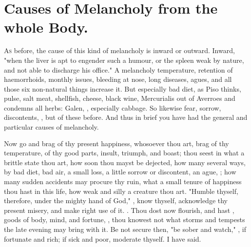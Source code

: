 \section{Causes of Melancholy from the whole Body.}

\lettrine{A}{s} before, the cause of this kind of melancholy is inward or
outward. Inward, "when the liver is apt to engender such a
humour, or the spleen weak by nature, and not able to discharge his office." A
melancholy temperature, retention of haemorrhoids, monthly issues, bleeding at
nose, long diseases, agues, and all those six non-natural things increase it.
But especially bad diet, as Piso thinks, pulse, salt meat,
shellfish, cheese, black wine, \etc{} Mercurialis out of Averroes and \Avicenna{}
condemns all herbs: Galen, , especially cabbage. So likewise fear, sorrow, discontents, \etc{}, but of
these before. And thus in brief you have had the general and particular causes
of melancholy.

Now go and brag of thy present happiness, whosoever thou art, brag of thy
temperature, of thy good parts, insult, triumph, and boast; thou seest in what
a brittle state thou art, how soon thou mayst be dejected, how many several
ways, by bad diet, bad air, a small loss, a little sorrow or discontent, an
ague, \etc{}; how many sudden accidents may procure thy ruin, what a small
tenure of happiness thou hast in this life, how weak and silly a creature thou
art. "Humble thyself, therefore, under the mighty hand of God," , know thyself, acknowledge thy present misery, and make right
use of it. . Thou dost now flourish, and hast
, goods of body, mind, and fortune,
, thou knowest not what storms and
tempests the late evening may bring with it. Be not secure then, "be sober and
watch," , if fortunate and
rich; if sick and poor, moderate thyself. I have said.

